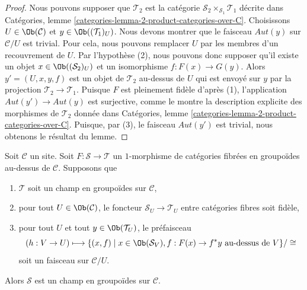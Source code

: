 \begin{proof}
Nous pouvons supposer que $\mathcal{T}_2$ est la catégorie
$\mathcal{S}_2 \times_{\mathcal{S}_1} \mathcal{T}_1$
décrite dans
Catégories, lemme \ref{categories-lemma-2-product-categories-over-C}.
Choisissons $U \in \Ob(\mathcal{C})$ et
$y \in \Ob((\mathcal{T}_1)_U)$.
Nous devons montrer que le faisceau $\mathit{Aut}(y)$ sur $\mathcal{C}/U$
est trivial. Pour cela, nous pouvons remplacer $U$ par les membres d'un
recouvrement de $U$. Par l'hypothèse (2), nous pouvons donc supposer
qu'il existe un objet $x \in \Ob((\mathcal{S}_2)_U)$
et un isomorphisme $f : F(x) \to G(y)$.
Alors $y' = (U, x, y, f)$ est un objet de $\mathcal{T}_2$ au-dessus de $U$
qui est envoyé sur $y$ par la projection $\mathcal{T}_2 \to \mathcal{T}_1$.
Puisque $F$ est pleinement fidèle d'après (1), l'application
$\mathit{Aut}(y') \to \mathit{Aut}(y)$ est surjective, comme le montre la description
explicite des morphismes de $\mathcal{T}_2$ donnée dans
Catégories, lemme \ref{categories-lemma-2-product-categories-over-C}.
Puisque, par (3), le faisceau $\mathit{Aut}(y')$ est trivial,
nous obtenons le résultat du lemme.
\end{proof}

\begin{lemma}
\label{lemma-relative-sheaf-over-stack-is-stack}
Soit $\mathcal{C}$ un site. Soit $F : \mathcal{S} \to \mathcal{T}$
un $1$-morphisme de catégories fibrées en groupoïdes au-dessus de $\mathcal{C}$.
Supposons que
\begin{enumerate}
\item $\mathcal{T}$ soit un champ en groupoïdes sur $\mathcal{C}$,
\item pour tout $U \in \Ob(\mathcal{C})$, le foncteur
$\mathcal{S}_U \to \mathcal{T}_U$ entre catégories fibres soit fidèle,
\item pour tout $U$ et tout $y \in \Ob(\mathcal{T}_U)$, le préfaisceau
$$
(h : V \to U)
\longmapsto
\{(x, f) \mid x \in \Ob(\mathcal{S}_V), f : F(x) \to f^*y\text{ au-dessus de }V\}/\cong
$$
soit un faisceau sur $\mathcal{C}/U$.
\end{enumerate}
Alors $\mathcal{S}$ est un champ en groupoïdes sur $\mathcal{C}$.
\end{lemma}

